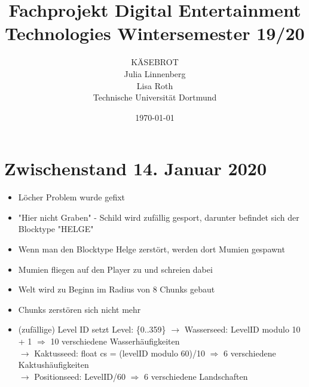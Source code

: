 \documentclass{article}
\title{Fachprojekt Digital Entertainment Technologies Wintersemester 19/20}
\author{KÄSEBROT\\
Julia Linnenberg  \\
		Lisa Roth\\	
	Technische Universität Dortmund \\
	}
\date{\today}
\begin{document}
\maketitle
\section{Zwischenstand 14. Januar 2020}
\begin{itemize}

\item Löcher Problem wurde gefixt

\item "Hier nicht Graben" - Schild wird zufällig gesport, darunter befindet sich der Blocktype "HELGE"
\item Wenn man den Blocktype Helge zerstört, werden dort Mumien gespawnt
\item Mumien fliegen auf den Player zu und schreien dabei

\item Welt wird zu Beginn im Radius von 8 Chunks gebaut
\item Chunks zerstören sich nicht mehr

\item (zufällige) Level ID setzt Level: \{0..359\}
$\rightarrow$ Wasserseed: LevelID modulo 10 + 1 $\Rightarrow$ 10 verschiedene Wasserhäufigkeiten\\
$\rightarrow$ Kaktusseed: float cs = (levelID modulo 60)/10 $\Rightarrow$ 6 verschiedene Kaktushäufigkeiten\\
$\rightarrow$ Positionseed: LevelID/60  $\Rightarrow$ 6 verschiedene Landschaften\\

\end{itemize}
\end{document}
